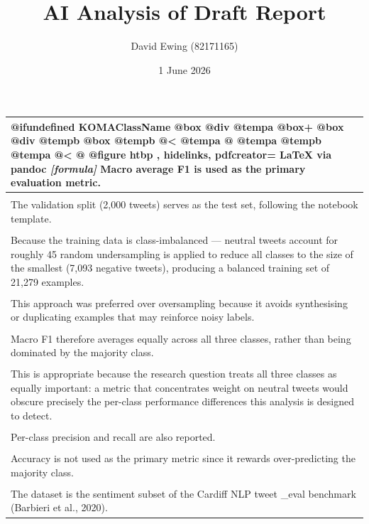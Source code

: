 \documentclass[11pt]{article}
\title{AI Analysis of Draft Report}
\author{David Ewing (82171165)}
\date{1 June 2026}
\begin{document}
\maketitle
\thispagestyle{empty}
\newpage

\begin{longtable}{|p{\dimexpr\linewidth-2\tabcolsep-2\arrayrulewidth\relax}|}
\hline
@ifundefined KOMAClassName @box @div @tempa @box+ @box @div @tempb @box @tempb @< @tempa @ @tempa @tempb @tempa @< @ @figure htbp , hidelinks, pdfcreator= LaTeX via pandoc \textit{[formula]} Macro average F1 is used as the primary evaluation metric. \\[2pt]
\hline
\rule{0pt}{3.5cm} \\
\hline
The validation split (2,000 tweets) serves as the test set, following the notebook template. \\[2pt]
\hline
\rule{0pt}{3.5cm} \\
\hline
Because the training data is class-imbalanced --- neutral tweets account for roughly 45 random undersampling is applied to reduce all classes to the size of the smallest (7,093 negative tweets), producing a balanced training set of 21,279 examples. \\[2pt]
\hline
\rule{0pt}{3.5cm} \\
\hline
This approach was preferred over oversampling because it avoids synthesising or duplicating examples that may reinforce noisy labels. \\[2pt]
\hline
\rule{0pt}{3.5cm} \\
\hline
Macro F1 therefore averages equally across all three classes, rather than being dominated by the majority class. \\[2pt]
\hline
\rule{0pt}{3.5cm} \\
\hline
This is appropriate because the research question treats all three classes as equally important: a metric that concentrates weight on neutral tweets would obscure precisely the per-class performance differences this analysis is designed to detect. \\[2pt]
\hline
\rule{0pt}{3.5cm} \\
\hline
Per-class precision and recall are also reported. \\[2pt]
\hline
\rule{0pt}{3.5cm} \\
\hline
Accuracy is not used as the primary metric since it rewards over-predicting the majority class. \\[2pt]
\hline
\rule{0pt}{3.5cm} \\
\hline
The dataset is the sentiment subset of the Cardiff NLP tweet \_eval benchmark (Barbieri et al., 2020). \\[2pt]

\end{longtable}
\end{document}
